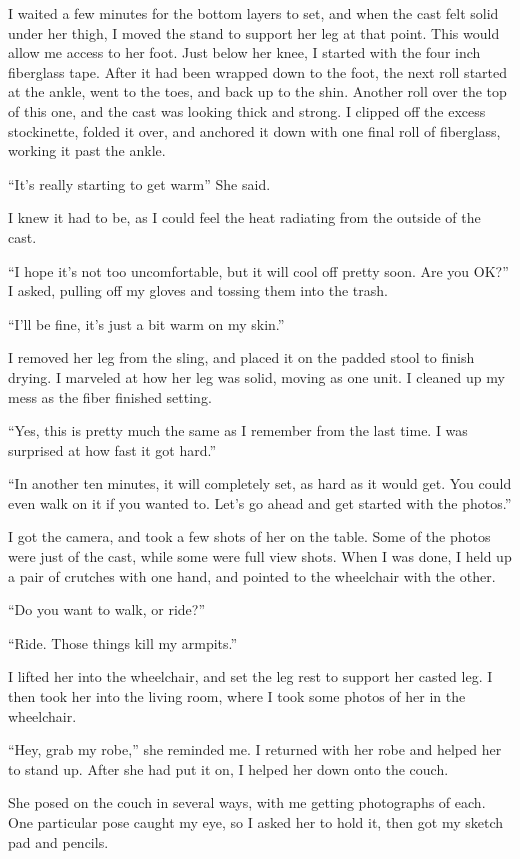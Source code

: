 I waited a few minutes for the bottom layers to set, and when the cast felt solid under her
thigh, I moved the stand to support her leg at that point. This would allow me access to her
foot. Just below her knee, I started with the four inch fiberglass tape. After it had been
wrapped down to the foot, the next roll started at the ankle, went to the toes, and back up to
the shin. Another roll over the top of this one, and the cast was looking thick and strong. I
clipped off the excess stockinette, folded it over, and anchored it down with one final roll of
fiberglass, working it past the ankle.

``It's really starting to get warm'' She said.

I knew it had to be, as I could feel the heat radiating from the outside of the cast.

``I hope it's not too uncomfortable, but it will cool off pretty soon. Are you OK?'' I asked,
pulling off my gloves and tossing them into the trash.

``I'll be fine, it's just a bit warm on my skin.''

I removed her leg from the sling, and placed it on the padded stool to finish drying. I marveled
at how her leg was solid, moving as one unit. I cleaned up my mess as the fiber finished
setting.

``Yes, this is pretty much the same as I remember from the last time. I was surprised at how
fast it got hard.''

``In another ten minutes, it will completely set, as hard as it would get. You could even walk
on it if you wanted to. Let's go ahead and get started with the photos.''

I got the camera, and took a few shots of her on the table. Some of the photos were just of the
cast, while some were full view shots. When I was done, I held up a pair of crutches with one
hand, and pointed to the wheelchair with the other.

``Do you want to walk, or ride?''

``Ride. Those things kill my armpits.''

I lifted her into the wheelchair, and set the leg rest to support her casted leg. I then took
her into the living room, where I took some photos of her in the wheelchair.

``Hey, grab my robe,'' she reminded me. I returned with her robe and helped her to stand up.
After she had put it on, I helped her down onto the couch.

She posed on the couch in several ways, with me getting photographs of each. One particular pose
caught my eye, so I asked her to hold it, then got my sketch pad and pencils.

